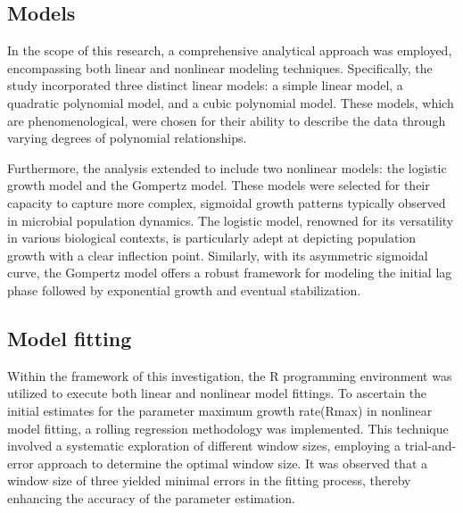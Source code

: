 \documentclass[11pt]{article}
\begin{document}
\subsection{Models}

In the scope of this research, a comprehensive analytical approach was employed, encompassing both linear and nonlinear modeling techniques. Specifically, the study incorporated three distinct linear models: a simple linear model, a quadratic polynomial model, and a cubic polynomial model. These models, which are phenomenological, were chosen for their ability to describe the data through varying degrees of polynomial relationships.

\hfill\break
Furthermore, the analysis extended to include two nonlinear models: the logistic growth model and the Gompertz model. These models were selected for their capacity to capture more complex, sigmoidal growth patterns typically observed in microbial population dynamics. The logistic model, renowned for its versatility in various biological contexts, is particularly adept at depicting population growth with a clear inflection point\cite{Agarwal}. Similarly, with its asymmetric sigmoidal curve, the Gompertz model offers a robust framework for modeling the initial lag phase followed by exponential growth and eventual stabilization\cite{Buchanan1997}.

\subsection{Model fitting}

Within the framework of this investigation, the R programming environment was utilized to execute both linear and nonlinear model fittings. To ascertain the initial estimates for the parameter maximum growth rate(Rmax) in nonlinear model fitting, a rolling regression methodology was implemented. This technique involved a systematic exploration of different window sizes, employing a trial-and-error approach to determine the optimal window size. It was observed that a window size of three yielded minimal errors in the fitting process, thereby enhancing the accuracy of the parameter estimation.
\end{document}
